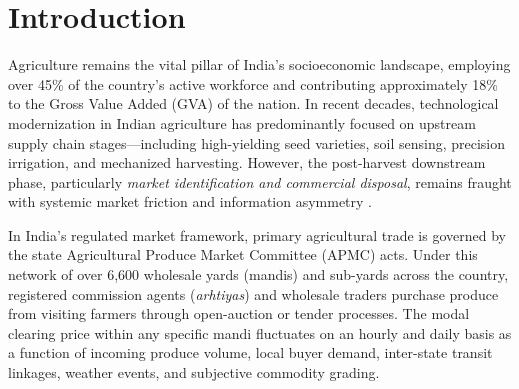 \documentclass[conference]{IEEEtran}
\begin{document}
\section{Introduction}

Agriculture remains the vital pillar of India's socioeconomic landscape, employing over 45\% of the country's active workforce and contributing approximately 18\% to the Gross Value Added (GVA) of the nation. In recent decades, technological modernization in Indian agriculture has predominantly focused on upstream supply chain stages---including high-yielding seed varieties, soil sensing, precision irrigation, and mechanized harvesting. However, the post-harvest downstream phase, particularly \textit{market identification and commercial disposal}, remains fraught with systemic market friction and information asymmetry \cite{b1, b2}.

In India's regulated market framework, primary agricultural trade is governed by the state Agricultural Produce Market Committee (APMC) acts. Under this network of over 6,600 wholesale yards (mandis) and sub-yards across the country, registered commission agents (\textit{arhtiyas}) and wholesale traders purchase produce from visiting farmers through open-auction or tender processes. The modal clearing price within any specific mandi fluctuates on an hourly and daily basis as a function of incoming produce volume, local buyer demand, inter-state transit linkages, weather events, and subjective commodity grading.
\end{document}
